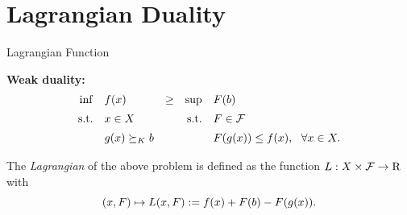 \documentclass[9pt]{beamer}
\begin{document}
      
            

      


\section{Lagrangian Duality}

\begin{frame}{Lagrangian Function}

  \textbf{Weak duality:}
  \[
    \begin{array}{rlcrl}
      \inf & f(x)  & \geq & \sup & F(b) \\[0.5em]
      \mathrm{s.t.} & x\in X   & &                       \mathrm{s.t.} & F \in \mathcal F \\[0.5em]
           & g(x) \succeq_{K} b &&    & F(g(x)) \leq f(x), ~~\forall x \in X.
    \end{array}
  \]

  \hrulefill
  
  \vfill

  The \emph{Lagrangian} of the above problem is defined as the function $L : X \times \mathcal F \to \mathrm{R}$ with
  \[
    (x, F) \mapsto L(x, F) := f(x) + F(b) - F(g(x)).
  \]
  
\end{frame}
\end{document}
